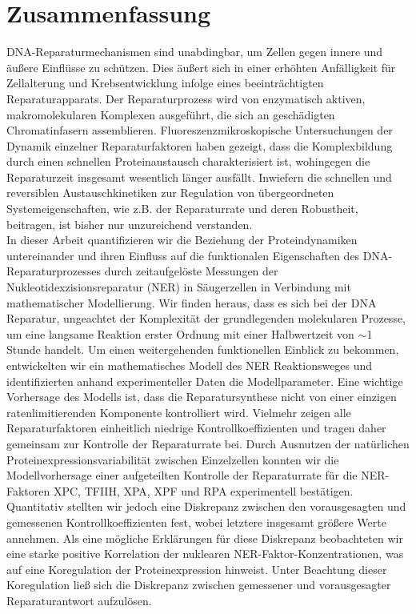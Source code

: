 \chapter*{Zusammenfassung}
\thispagestyle{plain2}


DNA-Reparaturmechanismen sind unabdingbar, um Zellen gegen innere und \"{a}u\ss{}ere Einfl\"{u}sse zu sch\"{u}tzen. Dies \"{a}u\ss{}ert sich in einer erh\"{o}hten Anf\"{a}lligkeit f\"{u}r Zellalterung und Krebsentwicklung infolge eines beeintr\"{a}chtigten Reparaturapparats. Der Reparaturprozess wird von enzymatisch aktiven, makromolekularen Komplexen ausgef\"{u}hrt, die sich an gesch\"{a}digten Chromatinfasern assemblieren. Fluoreszenzmikroskopische Untersuchung\-en der Dynamik einzelner Reparaturfaktoren haben gezeigt, dass die Komplexbildung durch einen schnellen Proteinaustausch charakterisiert ist, wohingegen die Reparaturzeit insgesamt wesentlich l\"{a}nger ausf\"{a}llt. Inwiefern die schnellen und reversiblen Austauschkinetiken zur Regulation von \"{u}bergeordneten Systemeigenschaften, wie z.B. der Reparaturrate und deren Robustheit, beitragen, ist bisher nur unzureichend verstanden.\\
In dieser Arbeit quantifizieren wir die Beziehung der Proteindynamiken untereinander und ihren Einfluss auf die funktionalen Eigenschaften des DNA-Reparaturprozesses durch zeitaufgel\"{o}ste Messungen der Nukleotidexzisionsreparatur (NER) in S\"{a}ugerzellen in Verbindung mit mathematischer Modellierung. Wir finden heraus, dass es sich bei der DNA Reparatur, ungeachtet der Komplexit\"{a}t der grundlegenden molekularen Prozesse, um eine langsame Reaktion erster Ordnung mit einer Halb\-wertzeit von $\sim$1 Stunde handelt. 
Um einen weitergehenden funktionellen Einblick zu bekommen, entwickelten wir ein ma\-the\-matisches Modell des NER Reaktionsweges und identifizierten anhand experimenteller Daten die Modellparameter. Eine wichtige Vorhersage des Modells ist, dass die Reparatursynthese nicht von einer einzigen ratenlimitierenden Komponente kontrolliert wird. Vielmehr zeigen alle Reparaturfaktoren einheitlich niedrige Kontroll\-koeffizienten und tragen daher gemeinsam zur Kontrolle der Reparaturrate bei. Durch Ausnutzen der nat\"{u}rlichen Proteinexpressionsvariabilit\"{a}t zwischen Einzelzellen konnten wir die Modell\-vorhersage einer aufgeteilten Kontrolle der Reparaturrate f\"{u}r die NER-Faktoren XPC, TFIIH, XPA, XPF und RPA experimentell best\"{a}tigen. Quantitativ stellten wir jedoch eine Diskrepanz zwischen den vorausgesagten und gemessenen Kontrollkoeffizienten fest, wobei letztere insgesamt gr\"{o}\ss{}ere Werte annehmen. Als eine m\"{o}gliche Erkl\"{a}rungen f\"{u}r diese Diskrepanz beobachteten wir eine starke positive Korrelation der nu\-klearen NER-Faktor-Konzentrationen, was auf eine Kore\-gulation der Proteinexpression hinweist. Unter Beachtung dieser Koregulation lie\ss{} sich die Diskrepanz zwischen gemessener und vorausgesagter Reparaturantwort aufzul\"{o}sen.\\              
